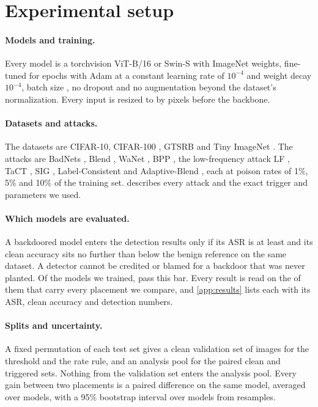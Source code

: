 \section{Experimental setup}
\label{sec:setup}

\paragraph{Models and training.}
Every model is a torchvision \cite{paszke2019pytorch} ViT-B/16 or Swin-S with ImageNet weights, fine-tuned for \TrainingEpochs{} epochs with Adam \cite{kingma2015adam} at a constant learning rate of $10^{-4}$ and weight decay $10^{-4}$, batch size \TrainingBatchSize{}, no dropout and no augmentation beyond the dataset's normalization. Every input is resized to \ModelInputSize{} by \ModelInputSize{} pixels before the backbone.

\paragraph{Datasets and attacks.}
The datasets are CIFAR-10, CIFAR-100 \cite{krizhevsky2009cifar}, GTSRB \cite{stallkamp2012gtsrb} and Tiny ImageNet \cite{le2015tiny}. The attacks are BadNets \cite{gu2017badnets}, Blend \cite{chen2017targeted}, WaNet \cite{nguyen2021wanet}, BPP \cite{wang2022bpp}, the low-frequency attack LF \cite{zeng2021lf}, TaCT \cite{tang2021demon}, SIG \cite{barni2019sig}, Label-Consistent \cite{turner2019label} and Adaptive-Blend \cite{qi2023adaptive}, each at poison rates of 1\%, 5\% and 10\% of the training set.  describes every attack and the exact trigger and parameters we used.

\paragraph{Which models are evaluated.}
A backdoored model enters the detection results only if its ASR is at least \AsrBar{} and its clean accuracy sits no further than \CleanDropBar{} below the benign reference on the same dataset. A detector cannot be credited or blamed for a backdoor that was never planted. Of the \PanelCellsTotal{} models we trained, \PanelCellsClearing{} pass this bar. Every result is read on the \PanelCellsCached{} of them that carry every placement we compare, and \cref{app:results} lists each with its ASR, clean accuracy and detection numbers.

\paragraph{Splits and uncertainty.}
A fixed permutation of each test set gives a clean validation set of \HeldoutSize{} images for the threshold and the rate rule, and an analysis pool for the paired clean and triggered sets. Nothing from the validation set enters the analysis pool. Every gain between two placements is a paired difference on the same model, averaged over models, with a 95\% bootstrap interval \cite{efron1993bootstrap} over models from \BootstrapResamples{} resamples.
